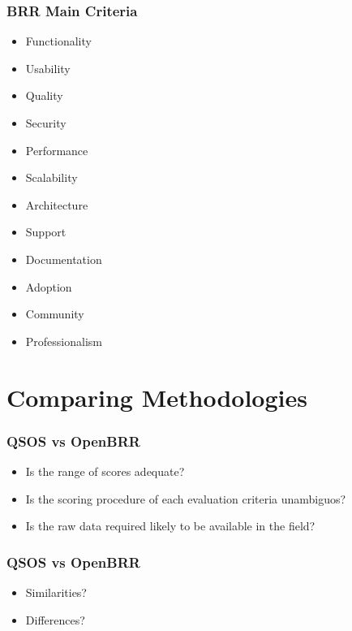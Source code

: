 \documentclass{beamer}
\begin{document}

\begin{frame}
 \frametitle{BRR Main Criteria}
 \begin{itemize}
   \item Functionality
   \item Usability
   \item Quality
   \item Security
   \item Performance
   \item Scalability
   \item Architecture
   \item Support
   \item Documentation
   \item Adoption
   \item Community
   \item Professionalism
\end{itemize}
\end{frame}



\section{Comparing Methodologies}

\begin{frame}
 \frametitle{QSOS vs OpenBRR}
 \begin{itemize}
 \item Is the range of scores adequate?
 \item Is the scoring procedure of each evaluation criteria unambiguos?
 \item Is the raw data required likely to be available in the field?
 \end{itemize}
\end{frame}



\begin{frame}
 \frametitle{QSOS vs OpenBRR}
 \begin{itemize}
 \item Similarities?
 \item Differences?
 \end{itemize}
\end{frame}

\end{document}
